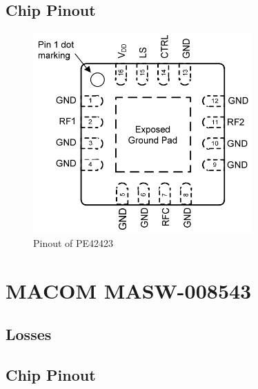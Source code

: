 \documentclass[12pt,openany,a4paper]{book}
\begin{document}
\subsection{Chip Pinout}
\begin{figure}[H]
	\centering
    \includegraphics[width=0.75\textwidth]{pe42423-datasheet-pinout.png}
	\caption{Pinout of PE42423}
	\label{fig:pe42423-pinout}
\end{figure} 


\section{MACOM MASW-008543}
\subsection{Losses}

\subsection{Chip Pinout}
\end{document}
